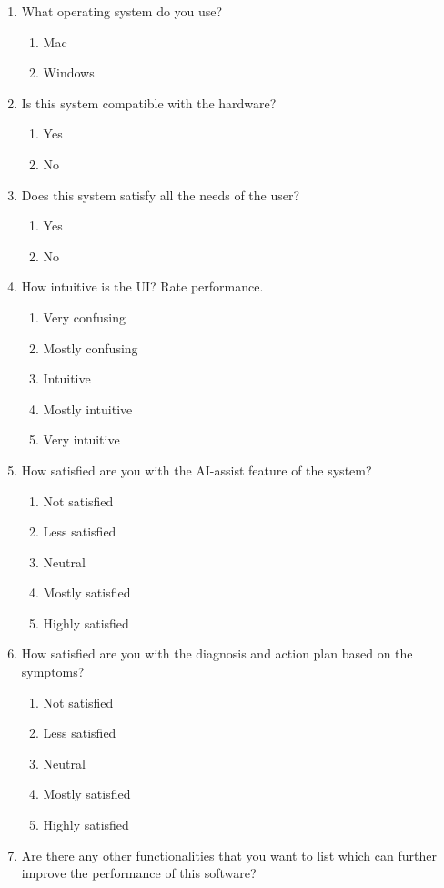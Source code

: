 \documentclass[12pt, titlepage]{article}
\begin{document}
\begin{enumerate}
  \item What operating system do you use?
  \begin{enumerate}
      \item Mac
      \item Windows
  \end{enumerate}

  \item Is this system compatible with the hardware?
  \begin{enumerate}
      \item Yes
      \item No
  \end{enumerate}

  \item Does this system satisfy all the needs of the user?
  \begin{enumerate}
      \item Yes
      \item No
  \end{enumerate}

  \item How intuitive is the UI? Rate performance.
  \begin{enumerate}
      \item Very confusing
      \item Mostly confusing
      \item Intuitive
      \item Mostly intuitive
      \item Very intuitive
  \end{enumerate}

  \item How satisfied are you with the AI-assist feature of the system?
  \begin{enumerate}
      \item Not satisfied
      \item Less satisfied
      \item Neutral
      \item Mostly satisfied
      \item Highly satisfied
  \end{enumerate}

  \item How satisfied are you with the diagnosis and action plan based on the symptoms?
  \begin{enumerate}
      \item Not satisfied
      \item Less satisfied
      \item Neutral
      \item Mostly satisfied
      \item Highly satisfied
  \end{enumerate}

  \item Are there any other functionalities that you want to list which can further improve the performance of this software?
\end{enumerate}
\end{document}
